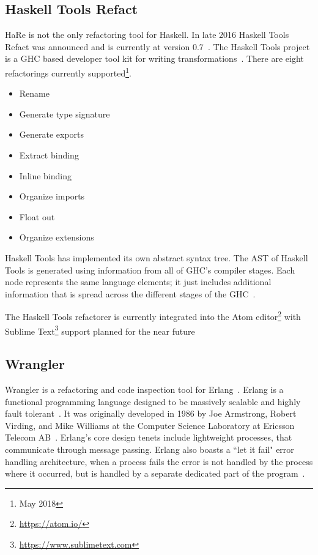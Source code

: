 \subsection{Haskell Tools Refact}

HaRe is not the only refactoring tool for Haskell. In late 2016 Haskell Tools Refact was announced and is currently at version 0.7~\citep{haskellTools}. The Haskell Tools project is a GHC based developer tool kit for writing transformations~\citep{haskellToolsGit}. There are eight refactorings currently supported\footnote{May 2018}.

\begin{itemize}
\item Rename
\item Generate type signature
\item Generate exports
\item Extract binding
\item Inline binding
\item Organize imports
\item Float out
\item Organize extensions
\end{itemize}

Haskell Tools has implemented  its own abstract syntax tree. The AST of Haskell Tools is generated using information from all of GHC's compiler stages. Each node represents the same language elements; it just includes additional information that is spread across the different stages of the GHC~\citep{haskellTools}.

The Haskell Tools refactorer is currently integrated into the Atom editor\footnote{\url{https://atom.io/}} with Sublime Text\footnote{\url{https://www.sublimetext.com}} support planned for the near future~\citep{haskellTools}

\subsection{Wrangler}\label{wranglerOne}
Wrangler is a refactoring and code inspection tool for Erlang~\citep{wrangler}. Erlang is a functional programming language designed to be massively scalable and highly fault tolerant~\citep{erlang}. It was originally developed in 1986 by Joe Armstrong, Robert Virding, and Mike Williams at the Computer Science Laboratory at Ericsson Telecom AB~\citep{erlangHistory}. Erlang's core design tenets include lightweight processes, that communicate through message passing. Erlang also boasts a ``let it fail" error handling architecture, when a process fails the error is not handled by the process where it occurred, but is handled by a separate dedicated part of the program~\citep{armstrongThesis}.

